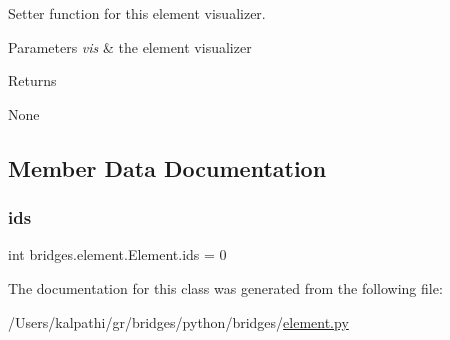 Setter function for this element visualizer. 


\begin{DoxyParams}{Parameters}
{\em vis} & the element visualizer \\
\hline
\end{DoxyParams}
\begin{DoxyReturn}{Returns}


None 
\end{DoxyReturn}


\subsection{Member Data Documentation}
\mbox{\label{classbridges_1_1element_1_1_element_a61f02c915a65554b76dd6534e5a4d834}} 
\subsubsection{\texorpdfstring{ids}{ids}}
{\footnotesize\ttfamily int bridges.\+element.\+Element.\+ids = 0\hspace{0.3cm}{\ttfamily [static]}}



The documentation for this class was generated from the following file\+:\begin{DoxyCompactItemize}
\item 
/\+Users/kalpathi/gr/bridges/python/bridges/\mbox{\hyperlink{element_8py}{element.\+py}}\end{DoxyCompactItemize}
